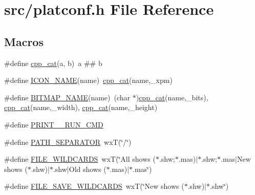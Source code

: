 \hypertarget{a00237}{\section{src/platconf.h File Reference}
\label{a00237}
}
\subsection*{Macros}
\begin{DoxyCompactItemize}
\item 
\#define \hyperlink{a00237_a67806498c1469c80d51543695c368738}{cpp\-\_\-cat}(a, b)~a \#\# b
\item 
\#define \hyperlink{a00237_a319b066f066942fdaac31dd4c598777f}{I\-C\-O\-N\-\_\-\-N\-A\-M\-E}(name)~\hyperlink{a00237_a67806498c1469c80d51543695c368738}{cpp\-\_\-cat}(name,\-\_\-xpm)
\item 
\#define \hyperlink{a00237_a29f1d1fe7c5c07492f3bf32665562b49}{B\-I\-T\-M\-A\-P\-\_\-\-N\-A\-M\-E}(name)~(char $\ast$)\hyperlink{a00237_a67806498c1469c80d51543695c368738}{cpp\-\_\-cat}(name,\-\_\-bits), \hyperlink{a00237_a67806498c1469c80d51543695c368738}{cpp\-\_\-cat}(name,\-\_\-width), \hyperlink{a00237_a67806498c1469c80d51543695c368738}{cpp\-\_\-cat}(name,\-\_\-height)
\item 
\#define \hyperlink{a00237_ad010cceafbf2fa11381d05b3e2a10625}{P\-R\-I\-N\-T\-\_\-\-\_\-\-R\-U\-N\-\_\-\-C\-M\-D}
\item 
\#define \hyperlink{a00237_a256a5721249aa3309437212cc21a9fe4}{P\-A\-T\-H\-\_\-\-S\-E\-P\-A\-R\-A\-T\-O\-R}~wx\-T(\char`\"{}/\char`\"{})
\item 
\#define \hyperlink{a00237_a679ca74e08219209b5fd011946a83b62}{F\-I\-L\-E\-\_\-\-W\-I\-L\-D\-C\-A\-R\-D\-S}~wx\-T(\char`\"{}All shows ($\ast$.shw;$\ast$.mas)$\vert$$\ast$.shw;$\ast$.mas$\vert$New shows ($\ast$.shw)$\vert$$\ast$.shw$\vert$Old shows ($\ast$.mas)$\vert$$\ast$.mas\char`\"{})
\item 
\#define \hyperlink{a00237_aeac1e45dcc4a4a59d145fe74895d3da1}{F\-I\-L\-E\-\_\-\-S\-A\-V\-E\-\_\-\-W\-I\-L\-D\-C\-A\-R\-D\-S}~wx\-T(\char`\"{}New shows ($\ast$.shw)$\vert$$\ast$.shw\char`\"{})
\end{DoxyCompactItemize}


